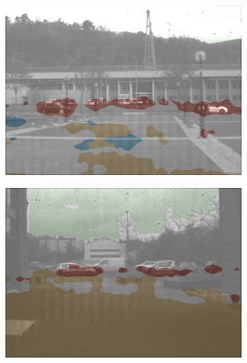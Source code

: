 \begin{figure}[h]
	
	\vspace{0.1cm}
	
	
	\begin{subfigure}[b]{0.18\linewidth}   
		\centering 
		\includegraphics[width=\linewidth]{Figures/Aug/NA2/selected_images/overlayed/over1205.jpg}
	\end{subfigure}
	\begin{subfigure}[b]{0.18\linewidth}
		\centering
		\includegraphics[width=\linewidth]{Figures/Aug/NA2/selected_images/overlayed/over4427.jpg}
	\end{subfigure}
	\begin{subfigure}[b]{0.18\linewidth}  
		\centering 

\end{subfigure}
\end{figure}
